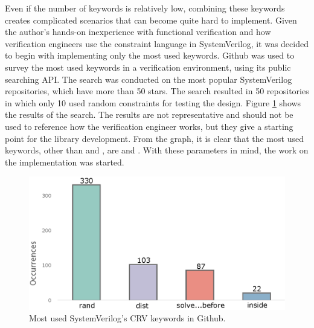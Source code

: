 Even if the number of keywords is relatively low, combining these keywords
creates complicated scenarios that can become quite hard to implement. Given the
author's hands-on inexperience with functional verification and how verification
engineers use the constraint language in SystemVerilog, it was decided to begin
with implementing only the most used keywords. Github was used to survey the
most used keywords in a verification environment, using its public searching
API. The search was conducted on the most popular SystemVerilog repositories,
which have more than 50 stars. The search resulted in 50 repositories in which
only 10 used random constraints for testing the design. Figure
\ref{fig:githubgraph} shows the results of the search. The results are not
representative and should not be used to reference how the verification engineer
works, but they give a starting point for the library development. From the
graph, it is clear that the most used keywords, other than  and
, are  and . With these
parameters in mind, the work on the implementation was started.

\begin{figure}[ht]
\centering
\includegraphics[width=0.7\linewidth]{pictures/Most_used_verification_keywords.eps}
\caption{Most used SystemVerilog's CRV keywords in Github.}
\label{fig:githubgraph}
\end{figure}

